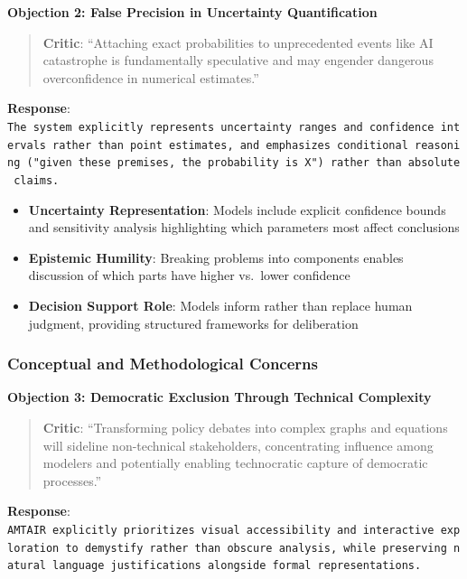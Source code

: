 \documentclass[
  11pt,
  letterpaper,
]{book}
\providecommand{\tightlist}{%
  \setlength{\itemsep}{0pt}\setlength{\parskip}{0pt}}
\begin{document}
\textbf{Objection 2: False Precision in Uncertainty Quantification}

\begin{quote}
\textbf{Critic}: ``Attaching exact probabilities to unprecedented events
like AI catastrophe is fundamentally speculative and may engender
dangerous overconfidence in numerical estimates.''
\end{quote}

\textbf{Response}:
\texttt{The\ system\ explicitly\ represents\ uncertainty\ ranges\ and\ confidence\ intervals\ rather\ than\ point\ estimates,\ and\ emphasizes\ conditional\ reasoning\ ("given\ these\ premises,\ the\ probability\ is\ X")\ rather\ than\ absolute\ claims.}

\begin{itemize}
\tightlist
\item
  \textbf{Uncertainty Representation}: Models include explicit
  confidence bounds and sensitivity analysis highlighting which
  parameters most affect conclusions
\item
  \textbf{Epistemic Humility}: Breaking problems into components enables
  discussion of which parts have higher vs.~lower confidence
\item
  \textbf{Decision Support Role}: Models inform rather than replace
  human judgment, providing structured frameworks for deliberation
\end{itemize}

\subsubsection{Conceptual and Methodological
Concerns}\label{sec-conceptual-concerns}

\textbf{Objection 3: Democratic Exclusion Through Technical Complexity}

\begin{quote}
\textbf{Critic}: ``Transforming policy debates into complex graphs and
equations will sideline non-technical stakeholders, concentrating
influence among modelers and potentially enabling technocratic capture
of democratic processes.''
\end{quote}

\textbf{Response}:
\texttt{AMTAIR\ explicitly\ prioritizes\ visual\ accessibility\ and\ interactive\ exploration\ to\ demystify\ rather\ than\ obscure\ analysis,\ while\ preserving\ natural\ language\ justifications\ alongside\ formal\ representations.}
\end{document}
